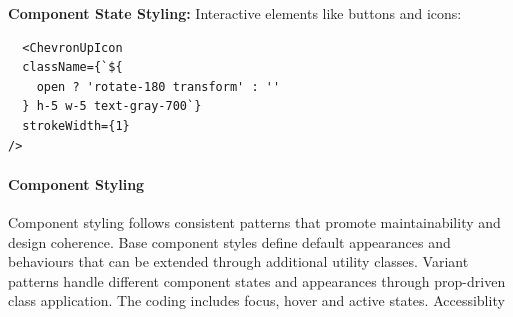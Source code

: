 \textbf{Component State Styling:} Interactive elements like buttons and icons:
\begin{verbatim}
  <ChevronUpIcon
  className={`${
    open ? 'rotate-180 transform' : ''
  } h-5 w-5 text-gray-700`}
  strokeWidth={1}
/>
\end{verbatim}

\paragraph{Component Styling}\mbox{}

Component styling follows consistent patterns that promote maintainability and design coherence. Base component styles define default appearances and behaviours that can be extended through additional utility classes. Variant patterns handle different component states and appearances through prop-driven class application. The coding includes focus, hover and active states. Accessiblity 

